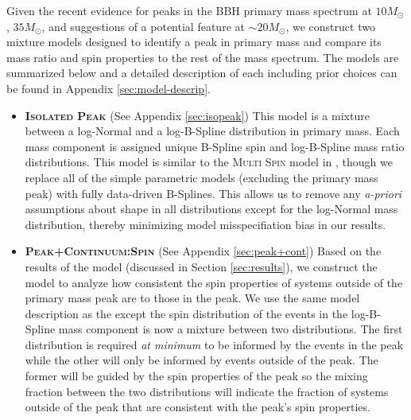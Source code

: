 Given the recent evidence for peaks \citep{2019ApJ...882L..24A, 2021ApJ...913L...7A, 2023PhRvX..13a1048A, 2022ApJ...928..155T,2022ApJ...924..101E, 2022arXiv221012834E,10.48550/arXiv.2302.07289} in the BBH primary mass spectrum at $10 M_{\odot}$, $35 M_{\odot}$, and suggestions of a potential feature at $\sim20 M_{\odot}$, we construct two mixture models designed to identify a peak in primary mass and compare its mass ratio and spin properties to the rest of the mass spectrum. The models are summarized below and a detailed description of each including prior choices can be found in Appendix \ref{sec:model-descrip}.

\begin{itemize}
    \item {\bfseries{\scshape Isolated Peak}} (See Appendix \ref{sec:isopeak}) This model is a mixture between a log-Normal and a log-B-Spline distribution in primary mass. Each mass component is assigned unique B-Spline spin and log-B-Spline mass ratio distributions. This model is similar to the \textsc{Multi Spin} model in \cite{2021ApJ...913L...7A}, though we replace all of the simple parametric models (excluding the primary mass peak) with fully data-driven B-Splines. This allows us to remove any \textit{a-priori} assumptions about shape in all distributions except for the log-Normal mass distribution, thereby minimizing model misspecifiation bias in our results.
\end{itemize} 

\begin{itemize}
    \item {\bfseries{\scshape Peak+Continuum:Spin}} (See Appendix \ref{sec:peak+cont}) Based on the results of the \base{} model (discussed in Section \ref{sec:results}), we construct the \comp{} model to analyze how consistent the spin properties of systems outside of the primary mass peak are to those in the peak. We use the same model description as the \base{} except the spin distribution of the events in the log-B-Spline mass component is now a mixture between two distributions. The first distribution is required \textit{at minimum} to be informed by the events in the peak while the other will only be informed by events outside of the peak. The former will be guided by the spin properties of the peak so the mixing fraction between the two distributions will indicate the fraction of systems outside of the peak that are consistent with the peak's spin properties. 
\end{itemize}


